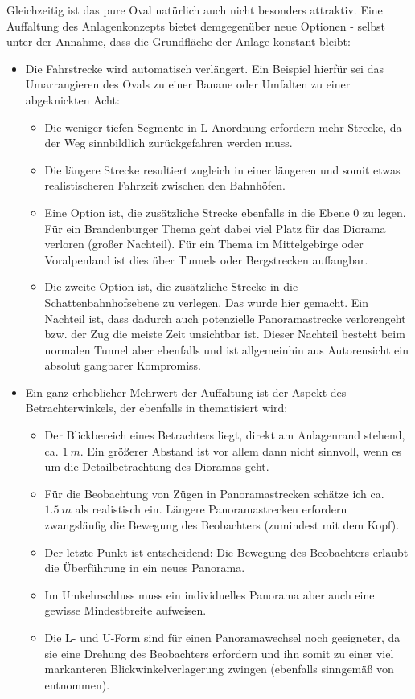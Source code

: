 Gleichzeitig ist das pure Oval nat\"urlich auch nicht besonders attraktiv.
Eine Auffaltung des Anlagenkonzepts bietet demgegen\"uber neue Optionen - selbst unter der Annahme, dass die Grundfl\"ache der Anlage konstant bleibt:
\begin{itemize}
	\item Die Fahrstrecke wird automatisch verl\"angert.
	Ein Beispiel hierf\"ur sei das Umarrangieren des Ovals zu einer Banane oder Umfalten zu einer abgeknickten Acht:
	\begin{itemize}
		\item Die weniger tiefen Segmente in L-Anordnung erfordern mehr Strecke, da der Weg sinnbildlich zur\"uckgefahren werden muss.
		\item Die l\"angere Strecke resultiert zugleich in einer l\"angeren und somit etwas realistischeren Fahrzeit zwischen den Bahnh\"ofen.
		\item Eine Option ist, die zus\"atzliche Strecke ebenfalls in die Ebene 0 zu legen.
		F\"ur ein Brandenburger Thema geht dabei viel Platz f\"ur das Diorama verloren (gro{\ss}er Nachteil).
		F\"ur ein Thema im Mittelgebirge oder Voralpenland ist dies \"uber Tunnels oder Bergstrecken auffangbar.
		\item Die zweite Option ist, die zus\"atzliche Strecke in die Schattenbahnhofsebene zu verlegen.
		Das wurde hier gemacht.
		Ein Nachteil ist, dass dadurch auch potenzielle Panoramastrecke verlorengeht bzw. der Zug die meiste Zeit unsichtbar ist.
		Dieser Nachteil besteht beim normalen Tunnel aber ebenfalls und ist allgemeinhin aus Autorensicht ein absolut gangbarer Kompromiss.
	\end{itemize}
	\item Ein ganz erheblicher Mehrwert der Auffaltung ist der Aspekt des Betrachterwinkels, der ebenfalls in \cite{Gee17} thematisiert wird:
	\begin{itemize}
		\item Der Blickbereich eines Betrachters liegt, direkt am Anlagenrand stehend, ca. $1~m$.
		Ein gr\"o{\ss}erer Abstand ist vor allem dann nicht sinnvoll, wenn es um die Detailbetrachtung des Dioramas geht.
		\item F\"ur die Beobachtung von Z\"ugen in Panoramastrecken sch\"atze ich ca. $1.5~m$ als realistisch ein.
		L\"angere Panoramastrecken erfordern zwangsl\"aufig die Bewegung des Beobachters (zumindest mit dem Kopf).
		\item Der letzte Punkt ist entscheidend: Die Bewegung des Beobachters erlaubt die \"Uberf\"uhrung in ein neues Panorama.
		\item Im Umkehrschluss muss ein individuelles Panorama aber auch eine gewisse Mindestbreite aufweisen.
		\item Die L- und U-Form sind f\"ur einen Panoramawechsel noch geeigneter, da sie eine Drehung des Beobachters erfordern und ihn somit zu einer viel markanteren Blickwinkelverlagerung zwingen (ebenfalls sinngem\"a{\ss} von \cite{Gee17} entnommen).
	\end{itemize}
\end{itemize}

